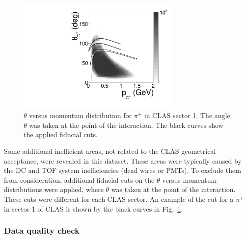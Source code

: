 \documentclass[prc,twocolumn,superscriptaddress,showpacs,amssymb,amsmath,amsfonts,aps,nofootinbib]{revtex4-1}
\begin{document}
\begin{figure}[htp]
\begin{center}
 \includegraphics[width=8cm,keepaspectratio]{pictures/fiducial_cuts/th_vs_p_pip.pdf} 
\vspace{-0.1cm}
\caption{$\theta$ versus momentum distribution for $\pi^{+}$ in CLAS sector 1. The angle $\theta$ was taken at the point of the interaction. The black curves show the applied fiducial cuts.}
\label{fig:fid_cuts_th_vs_p}
\end{center}
\end{figure}




Some additional inefficient areas, not related to the CLAS geometrical acceptance, were revealed in this dataset. These areas were typically caused by the DC and TOF system inefficiencies (dead wires or PMTs).  To exclude them from consideration, additional fiducial cuts on the $\theta$ versus momentum distributions were applied, where $\theta$ was taken at the point of the  interaction.  These cuts were different for each CLAS sector. An example of the cut for a $\pi^{+}$ in sector 1 of CLAS is shown by the black curves in Fig.~\ref{fig:fid_cuts_th_vs_p}. 

 


\subsubsection{Data quality check}
\end{document}
